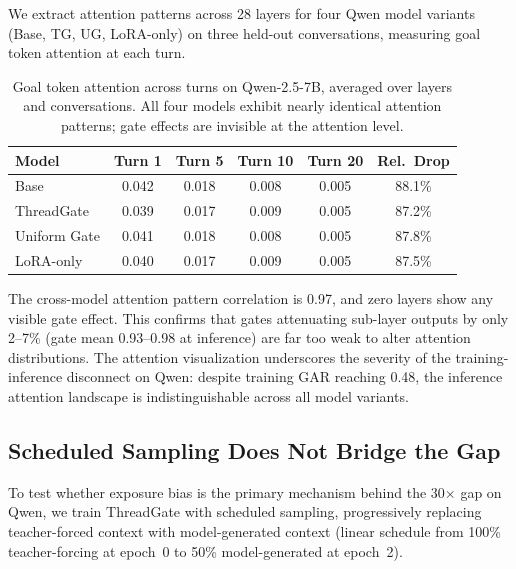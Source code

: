 \documentclass[11pt,a4paper]{article}
\begin{document}
We extract attention patterns across 28 layers for four Qwen model variants (Base, TG, UG, LoRA-only) on three held-out conversations, measuring goal token attention at each turn.

\begin{table}[h]
\centering
\small
\caption{Goal token attention across turns on Qwen-2.5-7B, averaged over layers and conversations. All four models exhibit nearly identical attention patterns; gate effects are invisible at the attention level.}
\label{tab:attention}
\begin{tabular}{lccccc}
\toprule
\textbf{Model} & \textbf{Turn 1} & \textbf{Turn 5} & \textbf{Turn 10} & \textbf{Turn 20} & \textbf{Rel.\ Drop} \\
\midrule
Base & 0.042 & 0.018 & 0.008 & 0.005 & 88.1\% \\
ThreadGate & 0.039 & 0.017 & 0.009 & 0.005 & 87.2\% \\
Uniform Gate & 0.041 & 0.018 & 0.008 & 0.005 & 87.8\% \\
LoRA-only & 0.040 & 0.017 & 0.009 & 0.005 & 87.5\% \\
\bottomrule
\end{tabular}
\end{table}

The cross-model attention pattern correlation is 0.97, and zero layers show any visible gate effect.
This confirms that gates attenuating sub-layer outputs by only 2--7\% (gate mean 0.93--0.98 at inference) are far too weak to alter attention distributions.
The attention visualization underscores the severity of the training-inference disconnect on Qwen: despite training GAR reaching 0.48, the inference attention landscape is indistinguishable across all model variants.

\subsection{Scheduled Sampling Does Not Bridge the Gap}
\label{sec:mitigation}

To test whether exposure bias is the primary mechanism behind the 30$\times$ gap on Qwen, we train ThreadGate with scheduled sampling, progressively replacing teacher-forced context with model-generated context (linear schedule from 100\% teacher-forcing at epoch~0 to 50\% model-generated at epoch~2).
\end{document}

